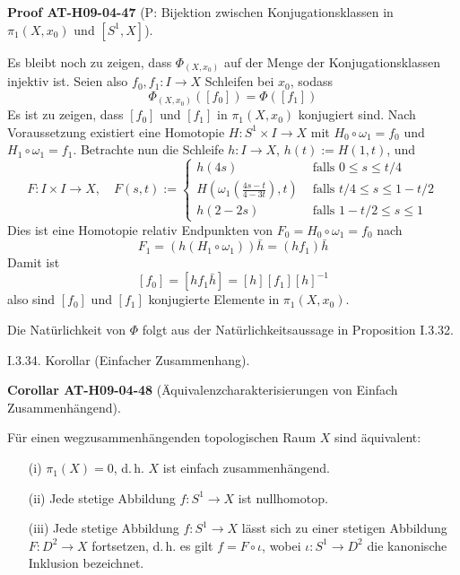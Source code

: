 \documentclass[10pt, letterpaper]{article}
\newcommand{\CustomHeading}[3]{%
  \par\medskip\noindent%
  \textbf{#1 #2} \textnormal{(#3)}.\enskip%
}
\newenvironment{KORO}[2]{\begin{unitbox}\CustomHeading{Corollar}{#1}{#2}}{\end{unitbox}}
\newenvironment{PROOF}[2]{\begin{unitbox}\CustomHeading{Proof}{#1}{#2}}{\end{unitbox}}
\begin{document}
\begin{PROOF}{AT-H09-04-47}{P: Bijektion zwischen Konjugationsklassen in $\pi_1\left(X, x_0\right)$ und $\left[S^1, X\right]$}
Es bleibt noch zu zeigen, dass $\Phi_{\left(X, x_0\right)}$ auf der Menge der Konjugationsklassen injektiv ist. Seien also $f_0, f_1: I \rightarrow X$ Schleifen bei $x_0$, sodass 
$$\Phi_{\left(X, x_0\right)}\left(\left[f_0\right]\right)=\Phi\left(\left[f_1\right]\right)$$ 
Es ist zu zeigen, dass $\left[f_0\right]$ und $\left[f_1\right]$ in $\pi_1\left(X, x_0\right)$ konjugiert sind. Nach Voraussetzung existiert eine Homotopie $H: S^1 \times I \rightarrow X$ mit $H_0 \circ \omega_1=f_0$ und $H_1 \circ \omega_1=f_1$. Betrachte nun die Schleife $h: I \rightarrow X$, $h(t):=H(1, t)$, und
$$
F: I \times I \rightarrow X, \quad F(s, t):= \begin{cases}h(4 s) & \text { falls } 0 \leq s \leq t / 4 \\ H\left(\omega_1\left(\frac{4 s-t}{4-3 t}\right), t\right) & \text { falls } t / 4 \leq s \leq 1-t / 2 \\ h(2-2 s) & \text { falls } 1-t / 2 \leq s \leq 1\end{cases}
$$
Dies ist eine Homotopie relativ Endpunkten von $F_0=H_0 \circ \omega_1=f_0$ nach 
$$F_1=\left(h\left(H_1 \circ \omega_1\right)\right) \bar{h}=\left(h f_1\right) \bar{h}$$ 
Damit ist 
$$\left[f_0\right]=\left[h f_1 \bar{h}\right]=[h]\left[f_1\right][h]^{-1}$$ 
also sind $\left[f_0\right]$ und $\left[f_1\right]$ konjugierte Elemente in $\pi_1\left(X, x_0\right)$. 

Die Natürlichkeit von $\Phi$ folgt aus der Natürlichkeitsaussage in Proposition I.3.32.
\end{PROOF}





I.3.34. Korollar (Einfacher Zusammenhang). 

\begin{KORO}{AT-H09-04-48}{Äquivalenzcharakterisierungen von Einfach Zusammenhängend}
Für einen wegzusammenhängenden topologischen Raum $X$ sind äquivalent:
\begin{enumerate}
  \item[\textup{(i)}] \(\pi_1(X) = 0\), d.\,h. \(X\) ist einfach zusammenhängend.
  \item[\textup{(ii)}] Jede stetige Abbildung \(f: S^1 \rightarrow X\) ist nullhomotop.
  \item[\textup{(iii)}] Jede stetige Abbildung \(f: S^1 \rightarrow X\) lässt sich zu einer stetigen Abbildung \(F: D^2 \rightarrow X\) fortsetzen, d.\,h. es gilt \(f = F \circ \iota\), wobei \(\iota: S^1 \rightarrow D^2\) die kanonische Inklusion bezeichnet.
\end{enumerate}
\end{KORO}
\end{document}

